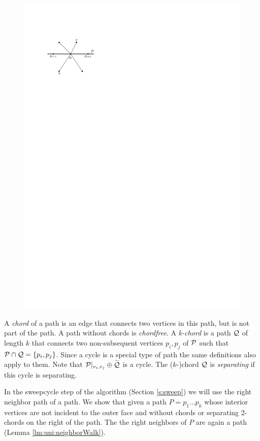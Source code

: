     \begin{figure}[h]
      \centering
      \includegraphics[scale=1]{unifiedAlgo/img/rightNeighbourwalk/rotation}
      \caption{}
      \label{fig:right:rot}
    \end{figure}

    A \emph{chord} of a path is an edge that connects two vertices in this path, but is not part of the path. A path without chords is \emph{chordfree}.
    A \emph{k-chord} is a path $\Q$ of length $k$ that connects two non-subsequent vertices $p_i, p_j$ of $\P$ such that $\P \cap \Q = \braces{p_i, p_j}$.
    Since a cycle is a special type of path the same definitions also apply to them.
    Note that $\P|_{v_i, v_j} \oplus \rev{\Q}$ is a cycle. The ($k$-)chord $\Q$ is \emph{separating} if this cycle is separating.

    In the sweepcycle step of the algorithm (Section \ref{s:sweep}) we will use the right neighbor path of a path. We show that given a path $P = p_1 \ldots p_k$ whose interior vertices are not incident to the outer face and without chords or separating 2-chords on the right of the path. The the right neighbors of $P$ are again a path (Lemma \ref{lm:uni:neighborWalk}).

